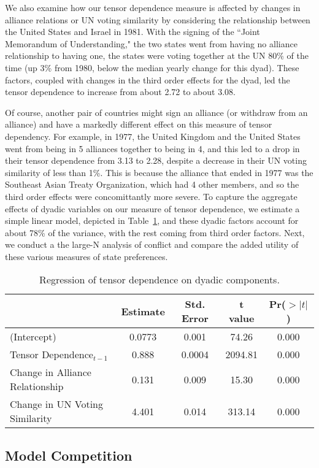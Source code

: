 We also examine how our tensor dependence measure is affected by changes in alliance relations or UN voting similarity by considering the relationship between the United States and Israel in 1981. With the signing of the ``Joint Memorandum of Understanding," the two states went from having no alliance relationship to having one, the states were voting together at the UN 80\% of the time (up 3\% from 1980, below the median yearly change for this dyad). These factors, coupled with changes in the third order effects for the dyad, led the tensor dependence to increase from about 2.72 to about 3.08. 

Of course, another pair of countries might sign an alliance (or withdraw from an alliance) and have a markedly different effect on this measure of tensor dependency. For example, in 1977, the United Kingdom and the United States went from being in 5 alliances together to being in 4, and this led to a drop in their tensor dependence from 3.13 to 2.28, despite a decrease in their UN voting similarity of less than 1\%. This is because the alliance that ended in 1977 was the Southeast Asian Treaty Organization, which had 4 other members, and so the third order effects were concomittantly more severe. To capture the aggregate effects of dyadic variables on our measure of tensor dependence, we estimate a simple linear model, depicted in Table~\ref{tensor:ols}, and these dyadic factors account for about 78\% of the variance, with the rest coming from third order factors. Next, we conduct a the large-N analysis of conflict and compare the added utility of these various measures of state preferences.

\begin{table}[ht]
	\centering
	\begin{tabular}{lcccc}
		\hline
		& Estimate & Std. Error & t value & Pr($>|t|$) \\ 
		\hline
		(Intercept) & 0.0773 & 0.001 & 74.26 & 0.000 \\ 
		Tensor Dependence$_{t-1}$ & 0.888 & 0.0004 & 2094.81 & 0.000 \\ 
		Change in Alliance Relationship & 0.131 & 0.009 & 15.30 & 0.000 \\ 
		Change in UN Voting Similarity & 4.401 & 0.014 & 313.14 & 0.000 \\ 
		\hline
	\end{tabular}
	\caption{Regression of tensor dependence on dyadic components.}
	\label{tensor:ols}	
\end{table}

\subsection*{Model Competition}


